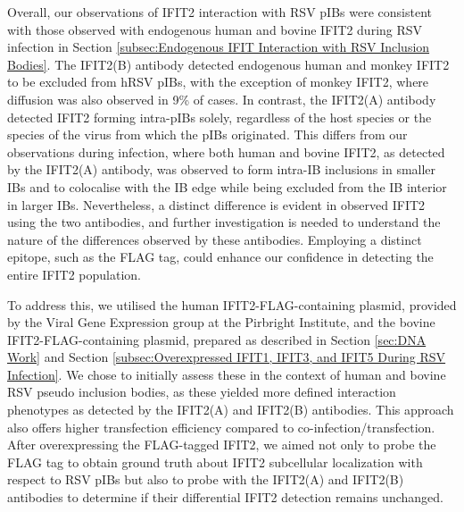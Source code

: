 Overall, our observations of IFIT2 interaction with RSV pIBs were consistent with those observed with endogenous human and bovine IFIT2 during RSV infection in Section \ref{subsec:Endogenous IFIT Interaction with RSV Inclusion Bodies}. The IFIT2(B) antibody detected endogenous human and monkey IFIT2 to be excluded from hRSV pIBs, with the exception of monkey IFIT2, where diffusion was also observed in 9\% of cases. In contrast, the IFIT2(A) antibody detected IFIT2 forming intra-pIBs solely, regardless of the host species or the species of the virus from which the pIBs originated. This differs from our observations during infection, where both human and bovine IFIT2, as detected by the IFIT2(A) antibody, was observed to form intra-IB inclusions in smaller IBs and to colocalise with the IB edge while being excluded from the IB interior in larger IBs. Nevertheless, a distinct difference is evident in observed IFIT2 using the two antibodies, and further investigation is needed to understand the nature of the differences observed by these antibodies. Employing a distinct epitope, such as the FLAG tag, could enhance our confidence in detecting the entire IFIT2 population.

To address this, we utilised the human IFIT2-FLAG-containing plasmid, provided by the Viral Gene Expression group at the Pirbright Institute, and the bovine IFIT2-FLAG-containing plasmid, prepared as described in Section \ref{sec:DNA Work} and Section \ref{subsec:Overexpressed IFIT1, IFIT3, and IFIT5 During RSV Infection}. We chose to initially assess these in the context of human and bovine RSV pseudo inclusion bodies, as these yielded more defined interaction phenotypes as detected by the IFIT2(A) and IFIT2(B) antibodies. This approach also offers higher transfection efficiency compared to co-infection/transfection. After overexpressing the FLAG-tagged IFIT2, we aimed not only to probe the FLAG tag to obtain ground truth about IFIT2 subcellular localization with respect to RSV pIBs but also to probe with the IFIT2(A) and IFIT2(B) antibodies to determine if their differential IFIT2 detection remains unchanged.

